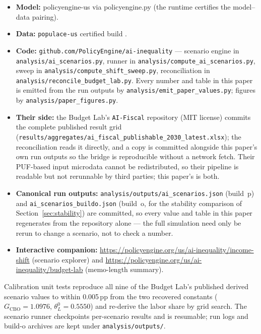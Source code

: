 \begin{itemize}
\item \textbf{Model:} policyengine-us \genModelVersion{} via policyengine.py
\genRunnerVersion{} (the runtime certifies the model--data pairing).
\item \textbf{Data:} \texttt{populace-us} certified build
\texttt{\genDataBuild}.
\item \textbf{Code:} \texttt{github.com/PolicyEngine/ai-inequality} ---
scenario engine in \texttt{analysis/ai\_scenarios.py}, runner in
\texttt{analysis/compute\_ai\_scenarios.py}, sweep in
\texttt{analysis/compute\_shift\_sweep.py}, reconciliation in
\texttt{analysis/reconcile\_budget\_lab.py}. Every number and table in this
paper is emitted from the run outputs by
\texttt{analysis/emit\_paper\_values.py}; figures by
\texttt{analysis/paper\_figures.py}.
\item \textbf{Their side:} the Budget Lab's \texttt{AI-Fiscal} repository
(MIT license) commits the complete published result grid
(\texttt{results/aggregates/ai\_fiscal\_publishable\_2030\_latest.xlsx});
the reconciliation reads it directly, and a copy is committed alongside this
paper's own run outputs so the bridge is reproducible without a network
fetch. Their PUF-based input microdata cannot be redistributed, so their
pipeline is readable but not rerunnable by third parties; this paper's is
both.
\item \textbf{Canonical run outputs:} \texttt{analysis/outputs/ai\_scenarios.json}
(build~p) and \texttt{ai\_scenarios\_buildo.json} (build~o, for the stability
comparison of Section~\ref{sec:stability}) are committed, so every value and
table in this paper regenerates from the repository alone --- the full
simulation need only be rerun to change a scenario, not to check a number.
\item \textbf{Interactive companion:}
\url{https://policyengine.org/us/ai-inequality/income-shift} (scenario
explorer) and \url{https://policyengine.org/us/ai-inequality/budget-lab}
(memo-length summary).
\end{itemize}

Calibration unit tests reproduce all nine of the Budget Lab's published
derived scenario values to within 0.005\,pp from the two recovered
constants ($G_{\mathrm{CBO}}=1.0976$, $\theta^0_L=0.5550$) and re-derive the
labor share by grid search. The scenario runner checkpoints per-scenario
results and is resumable; run logs and build-o archives are kept under
\texttt{analysis/outputs/}.
